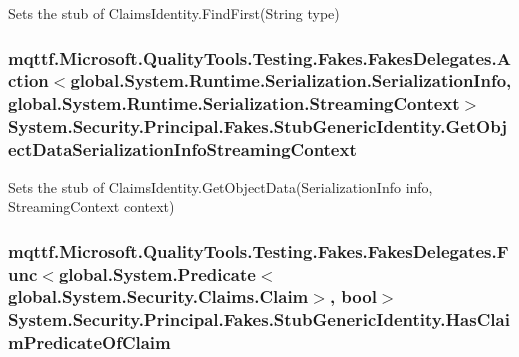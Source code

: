 Sets the stub of Claims\-Identity.\-Find\-First(\-String type)

\hypertarget{class_system_1_1_security_1_1_principal_1_1_fakes_1_1_stub_generic_identity_a6429aafc5e18889319e082b3b13c8a25}{
\subsubsection[{Get\-Object\-Data\-Serialization\-Info\-Streaming\-Context}]{\setlength{\rightskip}{0pt plus 5cm}mqttf.\-Microsoft.\-Quality\-Tools.\-Testing.\-Fakes.\-Fakes\-Delegates.\-Action$<$global.\-System.\-Runtime.\-Serialization.\-Serialization\-Info, global.\-System.\-Runtime.\-Serialization.\-Streaming\-Context$>$ System.\-Security.\-Principal.\-Fakes.\-Stub\-Generic\-Identity.\-Get\-Object\-Data\-Serialization\-Info\-Streaming\-Context}}\label{class_system_1_1_security_1_1_principal_1_1_fakes_1_1_stub_generic_identity_a6429aafc5e18889319e082b3b13c8a25}


Sets the stub of Claims\-Identity.\-Get\-Object\-Data(\-Serialization\-Info info, Streaming\-Context context)

\hypertarget{class_system_1_1_security_1_1_principal_1_1_fakes_1_1_stub_generic_identity_a811a8c4284cba0c2d96e7b96e21f9f44}{
\subsubsection[{Has\-Claim\-Predicate\-Of\-Claim}]{\setlength{\rightskip}{0pt plus 5cm}mqttf.\-Microsoft.\-Quality\-Tools.\-Testing.\-Fakes.\-Fakes\-Delegates.\-Func$<$global.\-System.\-Predicate$<$global.\-System.\-Security.\-Claims.\-Claim$>$, bool$>$ System.\-Security.\-Principal.\-Fakes.\-Stub\-Generic\-Identity.\-Has\-Claim\-Predicate\-Of\-Claim}}\label{class_system_1_1_security_1_1_principal_1_1_fakes_1_1_stub_generic_identity_a811a8c4284cba0c2d96e7b96e21f9f44}


